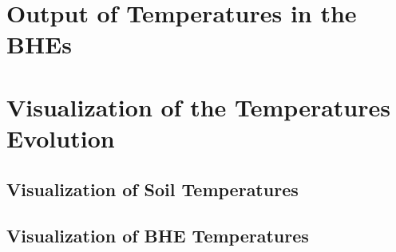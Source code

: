 \section{Output of Temperatures in the BHEs}
\label{sec:temp_output}


\section{Visualization of the Temperatures Evolution}

\subsection{Visualization of Soil Temperatures}

\subsection{Visualization of BHE Temperatures}


